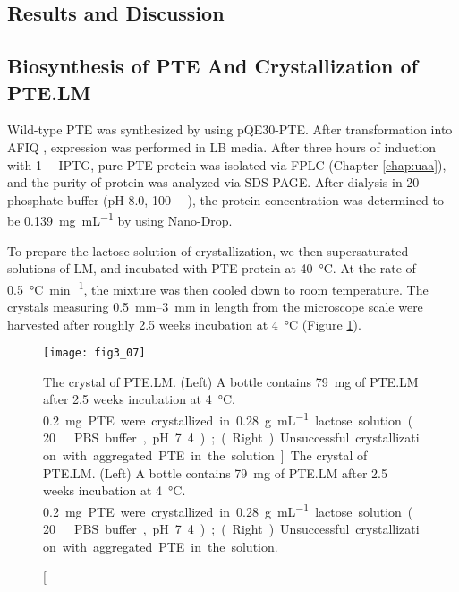 \begin{refsection}
\section{Results and Discussion}

\subsection{Biosynthesis of PTE And Crystallization of PTE.LM}

Wild-type PTE was synthesized by using pQE30-PTE. After transformation into
AFIQ , expression was performed in LB media. After three hours
of induction with \SI{1}{\milli\Molar} IPTG, pure PTE protein was isolated via
FPLC (Chapter \ref{chap:uaa}), and the purity of protein was analyzed via
SDS-PAGE. After dialysis in \SI{20}{\milli\Molar} phosphate buffer (pH 8.0,
\SI{100}{\micro\Molar} ), the protein concentration was determined to
be \SI{0.139}{\mg\per\mL} by using Nano-Drop.

To prepare the lactose solution of crystallization, we then supersaturated
solutions of LM, and incubated with PTE protein at \SI{40}{\celsius}. At the
rate of \SI{0.5}{\celsius\per\minute}, the mixture was then cooled down to room
temperature. The crystals measuring \SIrange{0.5}{3}{\mm} in length from the
microscope scale were harvested after roughly 2.5 weeks incubation at
\SI{4}{\celsius} (Figure \ref{fig:ptelm-bottle}). 
\begin{figure}[htbp] \centering \texttt{[image: fig3\_07]}
    \caption[The crystal of PTE.LM. (Left) A bottle contains
        \SI{79}{\mg} of PTE.LM after 2.5 weeks incubation at \SI{4}{\celsius}.
        \SI{0.2}mg PTE were crystallized in \SI{0.28}{\gram\per\mL} lactose
        solution (\SI{20}{\milli\Molar} PBS buffer, pH 7.4); (Right)
        Unsuccessful crystallization with aggregated PTE in the solution.]{The
            crystal of PTE.LM. (Left) A bottle contains \SI{79}{\mg} of PTE.LM
            after 2.5 weeks incubation at \SI{4}{\celsius}.  \SI{0.2}mg PTE
            were crystallized in \SI{0.28}{\gram\per\mL} lactose solution
            (\SI{20}{\milli\Molar} PBS buffer, pH 7.4); (Right) Unsuccessful
        crystallization with aggregated PTE in the solution.}
        \label{fig:ptelm-bottle} 
\end{figure}


\end{refsection}

